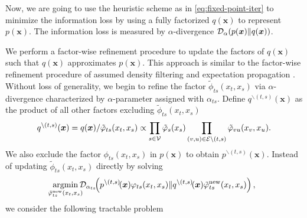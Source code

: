 Now, we are going to use the heuristic scheme as in \eqref{eq:fixed-point-iter} to minimize the information loss by using a fully factorized $q(\bm{x})$ to represent $p(\bm{x})$. The information loss is measured by $\alpha$-divergence $\mathcal{D}_{\alpha}(p(\bm{x}) \| q(\bm{x}))$.


We perform a factor-wise refinement procedure to update the factors of $q(\bm{x})$ such that $q(\bm{x})$ approximates $p(\bm{x})$. This approach is similar to the factor-wise refinement procedure of assumed density filtering\cite{ghosh2016assumed, opper1999bayesian} and expectation propagation \cite{divergence-measures-and-message-passing,Minka:2001:EPA:647235.720257}. Without loss of generality, we begin to refine the factor $\tilde{\phi}_{ts}(x_t, x_s)$ via $\alpha$-divergence characterized by $\alpha$-parameter assigned with $\alpha_{ts}$. Define $q^{\backslash (t,s)}(\bm{x})$ as the product of all other factors excluding $\tilde{\phi}_{ts}(x_t, x_s)$
\begin{align}
  q^{\backslash (t,s)}(\bm{x})
  = q(\bm{x})/\tilde{\varphi}_{ts}(x_t,
  x_s) \propto \prod_{{s\in \mathcal{V}}} \tilde{\varphi}_s(x_s) \prod_{(v,u) \in
  \mathcal{E}\backslash (t,s)}
  \tilde{\varphi}_{vu}(x_v, x_u).
\end{align}
We also exclude the factor $\phi_{ts}(x_t, x_s)$ in $p(\bm{x})$ to obtain $p^{\backslash (t,s)}(\bm{x})$. %
Instead of updating $\tilde{\phi}_{ts}(x_t, x_s)$ directly by solving
\begin{equation}
  \!\!\!\uargmin{\tilde{\phi}_{ts}^{\mathrm{new}}(x_t, x_s)}\!\!\!\! \Dd_{\alpha_{ts}}\!\!\left(  p^{\backslash (t,s)}\!(\bm{x})\phi_{ts}(x_t, x_s)\|q^{\backslash (t,s)}\!(\bm{x})\tilde{\phi}_{ts}^{\mathrm{new}}(x_t, x_s)\right),
\end{equation}
we consider the following tractable problem
